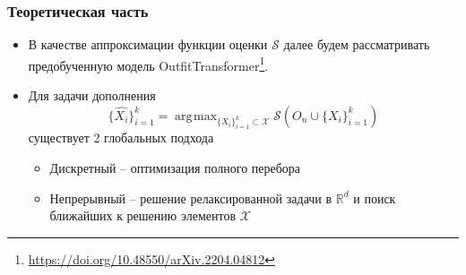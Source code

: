 \documentclass[10pt]{beamer}
\DeclareMathOperator*{\argmax}{\arg\!\max}
\begin{document}
%
%
%	
%		


\begin{frame}
	\frametitle{Теоретическая часть}
	\begin{itemize}	
	 	\item В качестве аппроксимации функции оценки $\mathcal{S}$ далее будем рассматривать предобученную модель OutfitTransformer\footnote{\url{https://doi.org/10.48550/arXiv.2204.04812}}.
	    \item Для задачи дополнения 
	    $$\{\hat{X_i}\}_{i=1}^k= \argmax_{\{X_i\}_{i=1}^k\subset\mathcal{X}} \mathcal{S}\left(O_n\cup\{X_i\}_{i=1}^k\right)$$
	    существует 2 глобальных подхода 
	    \begin{itemize}	
	    	\item Дискретный -- оптимизация полного перебора
	    	\item Непрерывный -- решение релаксированной задачи в $\mathbb{R}^d$ и поиск ближайших к решению элементов $\mathcal{X}$
	    \end{itemize}
	   \end{itemize}
\end{frame}
\end{document}
